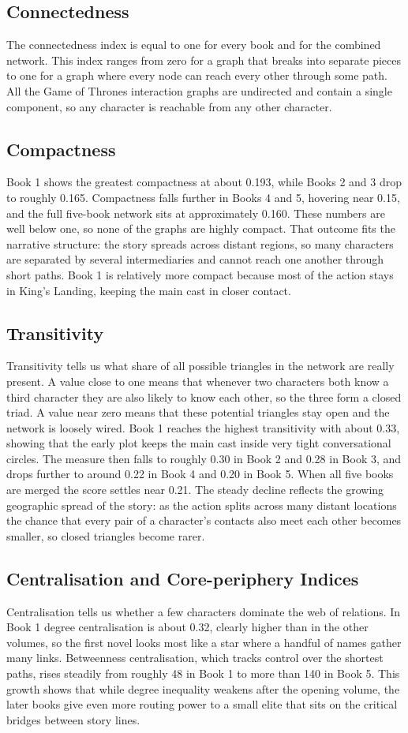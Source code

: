 \documentclass[12pt, a4paper]{article}
\begin{document}
\subsection*{Connectedness}
The connectedness index is equal to one for every book and for the combined network. This index ranges from zero for a graph that breaks into separate pieces to one for a graph where every node can reach every other through some path. All the Game of Thrones interaction graphs are undirected and contain a single component, so any character is reachable from any other character.
\subsection*{Compactness}
Book 1 shows the greatest compactness at about 0.193, while Books 2 and 3 drop to roughly 0.165. Compactness falls further in Books 4 and 5, hovering near 0.15, and the full five-book network sits at approximately 0.160. These numbers are well below one, so none of the graphs are highly compact. That outcome fits the narrative structure: the story spreads across distant regions, so many characters are separated by several intermediaries and cannot reach one another through short paths. Book 1 is relatively more compact because most of the action stays in King's Landing, keeping the main cast in closer contact.
\subsection*{Transitivity}
Transitivity tells us what share of all possible triangles in the network are really present. A value close to one means that whenever two characters both know a third character they are also likely to know each other, so the three form a closed triad. A value near zero means that these potential triangles stay open and the network is loosely wired. Book 1 reaches the highest transitivity with about 0.33, showing that the early plot keeps the main cast inside very tight conversational circles. The measure then falls to roughly 0.30 in Book 2 and 0.28 in Book 3, and drops further to around 0.22 in Book 4 and 0.20 in Book 5. When all five books are merged the score settles near 0.21. The steady decline reflects the growing geographic spread of the story: as the action splits across many distant locations the chance that every pair of a character's contacts also meet each other becomes smaller, so closed triangles become rarer.
\subsection*{Centralisation and Core-periphery Indices}
Centralisation tells us whether a few characters dominate the web of relations. In Book 1 degree centralisation is about 0.32, clearly higher than in the other volumes, so the first novel looks most like a star where a handful of names gather many links. Betweenness centralisation, which tracks control over the shortest paths, rises steadily from roughly 48 in Book 1 to more than 140 in Book 5. This growth shows that while degree inequality weakens after the opening volume, the later books give even more routing power to a small elite that sits on the critical bridges between story lines.
\end{document}
